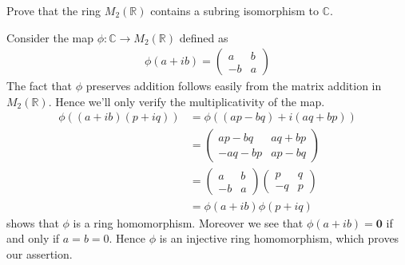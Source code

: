 \documentclass[12pt]{exam}
\theoremstyle{plain} %
\theoremstyle{definition} %
\theoremstyle{remark} %
\begin{document}
\begin{questions}
  \question
  Prove that the ring $M_2(\mathbb{R})$ contains a subring
  isomorphism to $\mathbb{C}$.
  \begin{solution}
    Consider the map $\phi: \mathbb{C} \to M_2(\mathbb{R})$ defined as
    \begin{align*}
      \phi(a + ib) =
      \begin{pmatrix}%
        a & b \\
        -b & a
      \end{pmatrix}
    \end{align*}
    The fact that $\phi$ preserves addition follows easily from the
    matrix addition in $M_2(\mathbb{R})$. Hence we'll only verify the
    multiplicativity of the map.
    \begin{align*}
      \phi((a + ib)(p + iq)) &= \phi((ap - bq) + i(aq + bp))  \\
      &=
      \begin{pmatrix}%
        ap - bq & aq + bp \\
        - aq - bp & ap - bq
      \end{pmatrix} \\
      &=
      \begin{pmatrix}%
        a & b \\
        -b & a
      \end{pmatrix}
      \begin{pmatrix}%
        p & q \\
        -q & p
      \end{pmatrix} \\
      & = \phi(a + ib) \phi(p + iq)
    \end{align*}
    shows that $\phi$ is a ring homomorphism. Moreover we see that
    $\phi(a + ib) = \textbf{0}$ if and only if $a = b = 0$. Hence
    $\phi$ is an injective ring homomorphism, which proves our assertion.
  \end{solution}

  \question
\end{questions}
\end{document}
